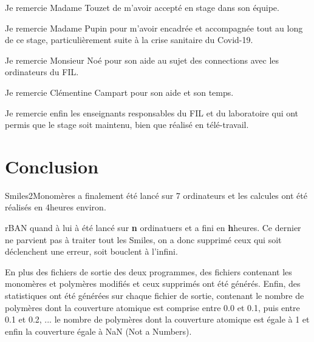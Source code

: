 \documentclass[11pt, a4paper]{report}
\begin{document}
	Je remercie Madame Touzet de m'avoir accepté en stage dans son équipe.
	
	Je remercie Madame Pupin pour m'avoir encadrée et accompagnée tout au long de ce stage, particulièrement suite à la crise sanitaire du Covid-19.
	
	Je remercie Monsieur Noé pour son aide au sujet des connections avec les ordinateurs du FIL.
	
	Je remercie Clémentine Campart pour son aide et son temps.
	
	Je remercie enfin les enseignants responsables du FIL et du laboratoire qui ont permis que le stage soit maintenu, bien que réalisé en télé-travail.
	
	\chapter*{Conclusion}
	
	Smiles2Monomères a finalement été lancé sur 7 ordinateurs et les calcules ont été réalisés en 4heures environ.
	
	rBAN quand à lui à été lancé sur \textbf{n} ordinatuers et a fini en \textbf{h}heures.
	Ce dernier ne parvient pas à traiter tout les Smiles, on a donc supprimé ceux qui soit déclenchent une erreur, soit bouclent à l'infini.
	
	En plus des fichiers de sortie des deux programmes, des fichiers contenant les monomères et polymères modifiés et ceux supprimés ont été générés. Enfin, des statistiques ont été générées sur chaque fichier de sortie, contenant le nombre de polymères dont la couverture atomique est comprise entre 0.0 et 0.1, puis entre 0.1 et 0.2, ... le nombre de polymères dont la couverture atomique est égale à 1 et enfin la couverture égale à NaN (Not a Numbers).
	
\end{document}
